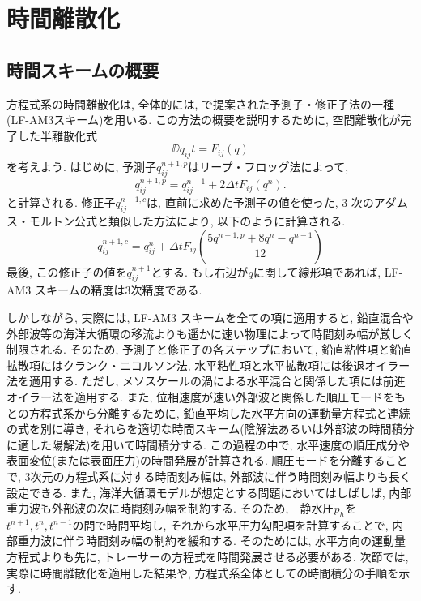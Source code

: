 \section{時間離散化}
\label{ocn_model_time_descretization}
\subsection{時間スキームの概要}
方程式系の時間離散化は, 全体的には, 
\cite{shchepetkin2005regional}で提案された予測子・修正子法の一種(LF-AM3スキーム)を用いる. 
この方法の概要を説明するために, 空間離散化が完了した半離散化式
\begin{equation*}
  \DD{q_{ij}}{t} = F_{ij}(q)
\end{equation*}
を考えよう. 
はじめに, 予測子$q_{ij}^{n+1,p}$はリープ・フロッグ法によって,  
\begin{equation*}
  q_{ij}^{n+1,p} = q_{ij}^{n-1} + 2\Delta t F_{ij} (q^{n}). 
\end{equation*}
と計算される. 
修正子$q_{ij}^{n+1,c}$は, 直前に求めた予測子の値を使った,  
3 次のアダムス・モルトン公式と類似した方法により, 以下のように計算される. 
$$ 
  q_{ij}^{n+1,c}
  = q_{ij}^n 
    + \Delta t F_{ij} \left(\dfrac{5q^{n+1,p}+8q^n-q^{n-1}}{12} \right) 
$$
最後, この修正子の値を$q_{ij}^{n+1}$とする.  
もし右辺が$q$に関して線形項であれば, LF-AM3 スキームの精度は3次精度である. 

しかしながら, 実際には, LF-AM3 スキームを全ての項に適用すると, 
鉛直混合や外部波等の海洋大循環の移流よりも遥かに速い物理によって時間刻み幅が厳しく制限される. 
そのため, 予測子と修正子の各ステップにおいて, 
鉛直粘性項と鉛直拡散項にはクランク・ニコルソン法, 
水平粘性項と水平拡散項には後退オイラー法を適用する. 
ただし, メソスケールの渦による水平混合と関係した項には前進オイラー法を適用する. 
また, 位相速度が速い外部波と関係した順圧モードをもとの方程式系から分離するために,  
鉛直平均した水平方向の運動量方程式と連続の式を別に導き, 
それらを適切な時間スキーム(陰解法あるいは外部波の時間積分に適した陽解法)を用いて時間積分する. 
この過程の中で, 水平速度の順圧成分や表面変位(または表面圧力)の時間発展が計算される. 
順圧モードを分離することで, 3次元の方程式系に対する時間刻み幅は, 外部波に伴う時間刻み幅よりも長く設定できる.  
また, 海洋大循環モデルが想定とする問題においてはしばしば, 内部重力波も外部波の次に時間刻み幅を制約する. 
そのため,　静水圧$p_h$を$t^{n+1},t^n,t^{n-1}$の間で時間平均し,
それから水平圧力勾配項を計算することで, 内部重力波に伴う時間刻み幅の制約を緩和する. 
そのためには, 水平方向の運動量方程式よりも先に, トレーサーの方程式を時間発展させる必要がある. 
次節では, 実際に時間離散化を適用した結果や, 方程式系全体としての時間積分の手順を示す. 

